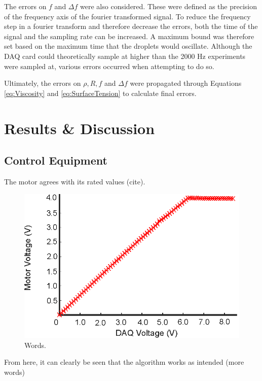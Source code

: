 \documentclass{physics_article_B}
\begin{document}
    The errors on $f$ and $\Delta f$ were also considered. These were defined as the precision of the frequency axis of the fourier transformed signal. To reduce the frequency step in a fourier transform and therefore decrease the errors, both the time of the signal and the sampling rate can be increased. A maximum bound was therefore set based on the maximum time that the droplets would oscillate. Although the DAQ card could theoretically sample at higher than the 2000 Hz experiments were sampled at, various errors occurred when attempting to do so.
    
    Ultimately, the errors on $\rho, R, f$ and $\Delta f$ were propagated through Equations \ref{eq:Viscosity} and \ref{eq:SurfaceTension} to calculate final errors.
    
\section{Results \& Discussion}
    
    \subsection{Control Equipment}
    
        The motor agrees with its rated values (cite).
    
		\begin{figure}[H]
        \centering
        \includegraphics{Figures/MotorCalib.eps}
        \captionsetup{justification=centering}
        \caption{Words.} 	
        \label{fig:MotorCalib}
        \end{figure} 
        
     	From here, it can clearly be seen that the algorithm works as intended (more words)
\end{document}
